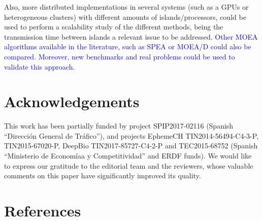 \documentclass[preprint]{elsarticle}
\begin{document}
Also, more distributed implementations in several systems (such as a
GPUs or heterogeneous clusters) with different amounts of
islands/processors, could be used to perform a scalability study of the
different methods, being the transmission time between islands a
relevant issue to be addressed. \textcolor{blue}{Other MOEA algorithms available in the literature, such as SPEA or MOEA/D could also be compared. Moreover, new benchmarks and real problems
could be  used to validate this approach.}



\section*{Acknowledgements}

This work has been partially funded by project SPIP2017-02116 (Spanish ``Direcci\'on General de Tr\'afico''), and projects EphemeCH TIN2014-56494-C4-3-P, TIN2015-67020-P, DeepBio TIN2017-85727-C4-2-P  and TEC2015-68752 (Spanish ``Ministerio de
Econom{\'ia}a y Competitividad'' and ERDF funds).
We would like to express our gratitude to the editorial team and the reviewers, whose valuable comments on this paper have significantly improved its quality.

\section*{References}



\end{document}
